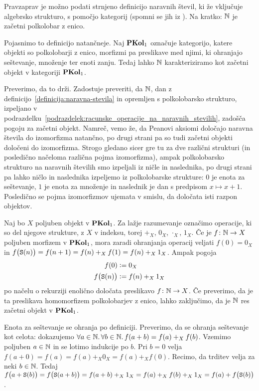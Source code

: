 Pravzaprav je možno podati strnjeno definicijo naravnih števil, ki že vključuje algebrsko strukturo, s pomočjo kategorij (spomni se jih iz ). Na kratko: $\mathbb{N}$ je začetni polkolobar z enico.

Pojasnimo to definicijo natančneje. Naj $\mathbf{PKol}_1$ označuje kategorijo, katere objekti so polkolobarji z enico, morfizmi pa preslikave med njimi, ki ohranjajo seštevanje, množenje ter enoti zanju. Tedaj lahko $\mathbb{N}$ karakteriziramo kot začetni objekt v kategoriji $\mathbf{PKol}_1$.

Preverimo, da to drži. Zadostuje preveriti, da $\mathbb{N}$, dan z definicijo~\ref{definicija:naravna-stevila} in opremljen s polkolobarsko strukturo, izpeljano v podrazdelku~\ref{podrazdelek:racunske_operacije_na_naravnih_stevilih}, zadošča pogoju za začetni objekt. Namreč, vemo že, da Peanovi aksiomi določajo naravna števila do izomorfizma natančno, po drugi strani pa so tudi začetni objekti določeni do izomorfizma. Strogo gledano sicer gre tu za dve različni strukturi (in posledično načeloma različna pojma izomorfizma), ampak polkolobarsko strukturo na naravnih številih smo izpeljali iz ničle in naslednika, po drugi strani pa lahko ničlo in naslednika izpeljemo iz polkolobarske strukture: $0$ je enota za seštevanje, $1$ je enota za množenje in naslednik je dan s predpisom $x \mapsto x + 1$. Posledično se pojma izomorfizmov ujemata v smislu, da določata isti razpon objektov.

Naj bo $X$ poljuben objekt v $\mathbf{PKol}_1$. Za lažje razumevanje označimo operacije, ki so del njegove strukture, z $X$ v indeksu, torej $+_X$, $0_X$, $\cdot_X$, $1_X$. Če je $f\colon \mathbb{N} \to X$ poljuben morfizem v $\mathbf{PKol}_1$, mora zaradi ohranjanja operacij veljati $f(0) = 0_X$ in $f\big(\mathtt{S}(n)\big) = f(n + 1) = f(n) +_X f(1) = f(n) +_X 1_X$. Ampak pogoja
\begin{align*}
f(0) &\mathrel{\mathop:}= 0_X \\
f\big(\mathtt{S}(n)\big) &\mathrel{\mathop:}= f(n) +_X 1_X
\end{align*}
po načelu o rekurziji enolično določata preslikavo $f\colon \mathbb{N} \to X$. Če preverimo, da je ta preslikava homomorfizem polkolobarjev z enico, lahko zaključimo, da je $\mathbb{N}$ res začetni objekt v $\mathbf{PKol}_1$.

Enota za seštevanje se ohranja po definiciji. Preverimo, da se ohranja seštevanje kot celota: dokazujemo $\forall a \in \mathbb{N} .\,\forall b \in \mathbb{N} .\,{f(a + b) = f(a) +_X f(b)}$. Vzemimo poljuben $a \in \mathbb{N}$ in se lotimo indukcije po $b$. Pri $b = 0$ velja $f(a + 0) = f(a) = f(a) +_X 0_X = f(a) +_X f(0)$. Recimo, da trditev velja za neki $b \in \mathbb{N}$. Tedaj $f\big(a + \mathtt{S}(b)\big) = f\big(\mathtt{S}(a + b)\big) = f(a + b) +_X 1_X = f(a) +_X f(b) +_X 1_X = f(a) + f\big(\mathtt{S}(b)\big)$.

